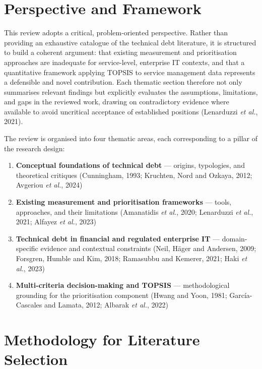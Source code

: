 \documentclass[
  11pt,
  letterpaper,
  11pt,
  oneside,
  english,
  onehalfspacing,
  headsepline]{MastersDoctoralThesis}
\providecommand{\tightlist}{%
  \setlength{\itemsep}{0pt}\setlength{\parskip}{0pt}}
\begin{document}
\section{Perspective and Framework}\label{perspective-and-framework}

This review adopts a critical, problem-oriented perspective. Rather than
providing an exhaustive catalogue of the technical debt literature, it
is structured to build a coherent argument: that existing measurement
and prioritisation approaches are inadequate for service-level,
enterprise IT contexts, and that a quantitative framework applying
TOPSIS to service management data represents a defensible and novel
contribution. Each thematic section therefore not only summarises
relevant findings but explicitly evaluates the assumptions, limitations,
and gaps in the reviewed work, drawing on contradictory evidence where
available to avoid uncritical acceptance of established positions
(Lenarduzzi \emph{et al.}, 2021).

The review is organised into four thematic areas, each corresponding to
a pillar of the research design:

\begin{enumerate}
\def\labelenumi{\arabic{enumi}.}
\tightlist
\item
  \textbf{Conceptual foundations of technical debt} --- origins,
  typologies, and theoretical critiques (Cunningham, 1993; Kruchten,
  Nord and Ozkaya, 2012; Avgeriou \emph{et al.}, 2024)
\item
  \textbf{Existing measurement and prioritisation frameworks} --- tools,
  approaches, and their limitations (Amanatidis \emph{et al.}, 2020;
  Lenarduzzi \emph{et al.}, 2021; Alfayez \emph{et al.}, 2023)
\item
  \textbf{Technical debt in financial and regulated enterprise IT} ---
  domain-specific evidence and contextual constraints (Neil, Häger and
  Andersen, 2009; Forsgren, Humble and Kim, 2018; Ramasubbu and Kemerer,
  2021; Haki \emph{et al.}, 2023)
\item
  \textbf{Multi-criteria decision-making and TOPSIS} --- methodological
  grounding for the prioritisation component (Hwang and Yoon, 1981;
  García-Cascales and Lamata, 2012; Albarak \emph{et al.}, 2022)
\end{enumerate}

\section{Methodology for Literature
Selection}\label{methodology-for-literature-selection}
\end{document}
